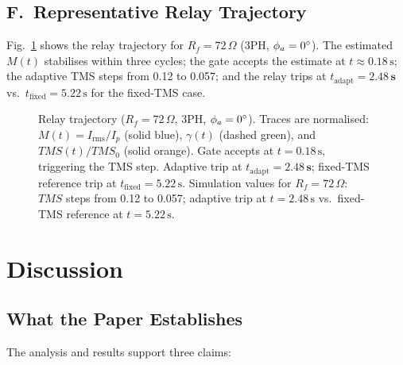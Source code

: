\documentclass[10pt,journal,twoside]{IEEEtran}
\newcommand{\sss}{\,\text{s}}
\newcommand{\Rf}{R_{\!f}}
\newcommand{\tms}{TMS}
\begin{document}
\subsection{F.\ Representative Relay Trajectory}
\label{sec:results:trajectory}

Fig.~\ref{fig:trajectory} shows the relay trajectory for
$\Rf = 72\,\Omega$ (3PH, $\phi_a = 0\degree$).
The estimated $M(t)$ stabilises within three cycles; the gate accepts the
estimate at $t \approx 0.18\sss$; the adaptive TMS steps from 0.12 to 0.057;
and the relay trips at $t_{\mathrm{adapt}} = \mathbf{2.48\sss}$ vs.\
$t_{\mathrm{fixed}} = 5.22\sss$ for the fixed-TMS case.

\begin{figure}[!t]
\centering

\caption{Relay trajectory ($\Rf = 72\,\Omega$, 3PH, $\phi_a=0\degree$).
  Traces are normalised: $M(t) = I_{\mathrm{rms}}/I_p$ (solid blue),
  $\gamma(t)$ (dashed green), and $\tms(t)/\tms_0$ (solid orange).
  Gate accepts at $t = 0.18\sss$, triggering the TMS step.
  Adaptive trip at $t_{\mathrm{adapt}} = \mathbf{2.48\sss}$; fixed-TMS
  reference trip at $t_{\mathrm{fixed}} = 5.22\sss$.
  Simulation values for $\Rf=72\,\Omega$: $\tms$ steps from 0.12 to 0.057;
  adaptive trip at $t=2.48\sss$ vs.\ fixed-TMS reference at $t=5.22\sss$.}
\label{fig:trajectory}
\end{figure}

\section{Discussion}
\label{sec:discussion}

\subsection{What the Paper Establishes}

The analysis and results support three claims:
\end{document}
